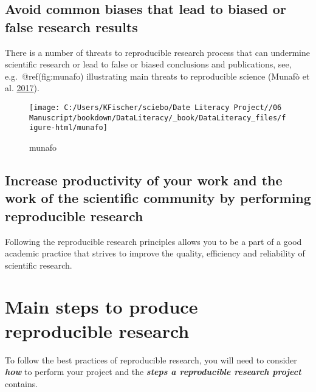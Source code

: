 \documentclass[
]{book}
\begin{document}
\hypertarget{avoid-common-biases-that-lead-to-biased-or-false-research-results}{%
\subsection{Avoid common biases that lead to biased or false research
results}\label{avoid-common-biases-that-lead-to-biased-or-false-research-results}}

There is a number of threats to reproducible research process that can
undermine scientific research or lead to false or biased conclusions and
publications, see, e.g.~@ref(fig:munafo) illustrating main threats to
reproducible science (Munafò et al.
\protect\hyperlink{ref-munafo_manifesto_2017}{2017}).

\begin{figure}

{\centering \texttt{[image: C:/Users/KFischer/sciebo/Date Literacy Project//06 Manuscript/bookdown/DataLiteracy/\_book/DataLiteracy\_files/figure-html/munafo]} 

}

\caption{munafo}\label{fig:unnamed-chunk-1}
\end{figure}

\hypertarget{increase-productivity-of-your-work-and-the-work-of-the-scientific-community-by-performing-reproducible-research}{%
\subsection{Increase productivity of your work and the work of the
scientific community by performing reproducible
research}\label{increase-productivity-of-your-work-and-the-work-of-the-scientific-community-by-performing-reproducible-research}}

Following the reproducible research principles allows you to be a part
of a good academic practice that strives to improve the quality,
efficiency and reliability of scientific research.

\hypertarget{main-steps-to-produce-reproducible-research}{%
\section{Main steps to produce reproducible
research}\label{main-steps-to-produce-reproducible-research}}

To follow the best practices of reproducible research, you will need to
consider \textbf{\emph{how}} to perform your project and the
\textbf{\emph{steps a reproducible research project}} contains.
\end{document}
